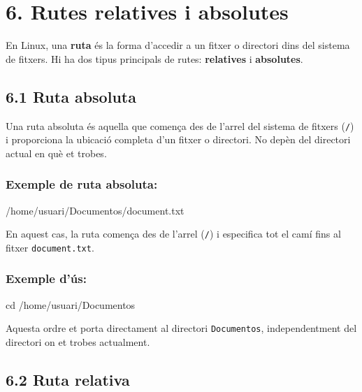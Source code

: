 \documentclass[
  12 pt,
  a4paper,
]{article}
\newenvironment{Shaded}{\begin{snugshade}}{\end{snugshade}}
\newcommand{\BuiltInTok}[1]{#1}
\newcommand{\ExtensionTok}[1]{#1}
\newcommand{\NormalTok}[1]{#1}
\begin{document}
\section{6. Rutes relatives i
absolutes}\label{rutes-relatives-i-absolutes}

En Linux, una \textbf{ruta} és la forma d'accedir a un fitxer o
directori dins del sistema de fitxers. Hi ha dos tipus principals de
rutes: \textbf{relatives} i \textbf{absolutes}.

\subsection{6.1 Ruta absoluta}\label{ruta-absoluta}

Una ruta absoluta és aquella que comença des de l'arrel del sistema de
fitxers (\texttt{/}) i proporciona la ubicació completa d'un fitxer o
directori. No depèn del directori actual en què et trobes.

\subsubsection{Exemple de ruta
absoluta:}\label{exemple-de-ruta-absoluta}

\begin{Shaded}
\begin{Highlighting}[]
\ExtensionTok{/home/usuari/Documentos/document.txt}
\end{Highlighting}
\end{Shaded}

En aquest cas, la ruta comença des de l'arrel (\texttt{/}) i especifica
tot el camí fins al fitxer \texttt{document.txt}.

\subsubsection{Exemple d'ús:}\label{exemple-duxfas}

\begin{Shaded}
\begin{Highlighting}[]
\BuiltInTok{cd}\NormalTok{ /home/usuari/Documentos}
\end{Highlighting}
\end{Shaded}

Aquesta ordre et porta directament al directori \texttt{Documentos},
independentment del directori on et trobes actualment.

\subsection{6.2 Ruta relativa}\label{ruta-relativa}
\end{document}
